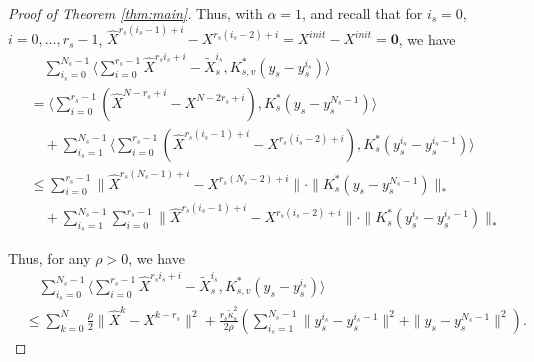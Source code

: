 \documentclass[10pt]{article}
\newcommand{\mb}{\mathbf}
\begin{document}
\begin{proof}[Proof of Theorem \ref{thm:main}]
Thus, with $\alpha = 1$, and recall that for $i_s=0$, $i=0,\ldots,r_s-1$, $\widehat{X}^{r_s(i_s-1)+i}-X^{r_s(i_s-2)+i} = X^{init} - X^{init} = \mb 0$, we have
\begin{align*}
   &\quad \sum_{i_s=0}^{N_s-1}\langle\sum_{i=0}^{r_s-1} \widehat{X}^{r_si_s+i}-\widetilde{X}_{s}^{i_s},K^*_{s,v}(y_s-y_s^{i_s})\rangle \\
   &= \langle \sum_{i=0}^{r_s-1}(\widehat{X}^{N-r_s+i}-X^{N-2r_s+i}) ,K^*_{s}(y_s-y_s^{N_s-1})\rangle\\
   &\quad +  \sum_{i_s=1}^{N_s-1}\langle \sum_{i=0}^{r_s-1} (\widehat{X}^{r_s(i_s-1)+i}-X^{r_s(i_s-2)+i}),K^*_{s}(y_s^{i_s}-y_s^{i_s-1})\rangle\\
   &\leq \sum_{i=0}^{r_s-1} \|\widehat{X}^{r_s(N_s-1)+i}-X^{r_s(N_s-2)+i}\|\cdot \| K^*_{s}(y_s-y_s^{N_s-1})\|_{*} \\
   &\quad +  \sum_{i_s=1}^{N_s-1}\sum_{i=0}^{r_s-1}   \|\widehat{X}^{r_s(i_s-1)+i}-X^{r_s(i_s-2)+i}\|\cdot \|K^*_{s}(y_s^{i_s}-y_s^{i_s-1})\|_{*}
\end{align*}

Thus, for any $\rho>0$, we have 
\begin{align}\label{eq:mix_term1}
    &\quad \sum_{i_s=0}^{N_s-1}\langle\sum_{i=0}^{r_s-1} \widehat{X}^{r_si_s+i}-\widetilde{X}_{s}^{i_s},K^*_{s,v}(y_s-y_s^{i_s})\rangle \nonumber\\
    &\leq \sum_{k=0}^{N} \frac{\rho}{2}\|\widehat{X}^{k}-X^{k-r_s}\|^2 + \frac{r_s\widetilde{\kappa}^2_{s}}{2\rho}(\sum_{i_s=1}^{N_s-1}\|y_s^{i_s}-y_s^{i_s-1}\|^2 +  \|y_s-y_s^{N_s-1}\|^2).
\end{align}


\end{proof}
\end{document}
